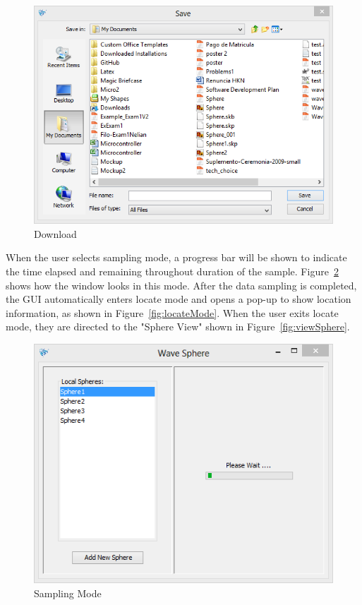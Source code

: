 \begin{figure}[H]
	\centering
	\includegraphics[scale=0.7]{img/download}
	\caption{Download \label{fig:download}}
\end{figure}

When the user selects sampling mode, a progress bar will be shown to indicate the time elapsed and remaining throughout duration of the sample. Figure~\ref{fig:samplingMode} shows how the window looks in this mode. After the data sampling is completed, the GUI automatically enters locate mode and opens a pop-up to show location information, as shown in Figure~\ref{fig:locateMode}.  When the user exits locate mode, they are directed to the "Sphere View" shown in Figure~\ref{fig:viewSphere}.
\begin{figure}[H]
	\centering
	\includegraphics[scale=0.7]{img/samplingMode}
	\caption{Sampling Mode \label{fig:samplingMode}}
\end{figure}

